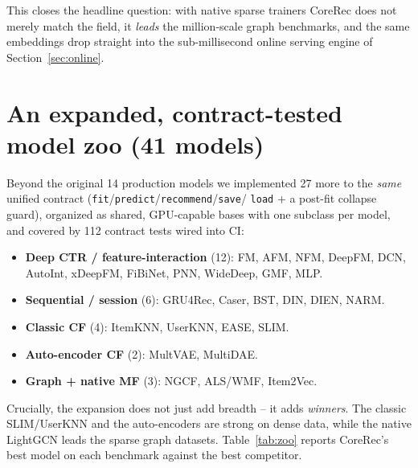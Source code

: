 \documentclass[10pt]{article}
\begin{document}
This closes the headline question: with native sparse trainers CoreRec does not
merely match the field, it \emph{leads} the million-scale graph benchmarks, and the
same embeddings drop straight into the sub-millisecond online serving engine of
Section~\ref{sec:online}.

\section{An expanded, contract-tested model zoo (41 models)}
\label{sec:zoo}
Beyond the original 14 production models we implemented 27 more to the \emph{same}
unified contract (\texttt{fit}/\texttt{predict}/\texttt{recommend}/\texttt{save}/
\texttt{load} + a post-fit collapse guard), organized as shared, GPU-capable bases
with one subclass per model, and covered by 112 contract tests wired into CI:

\begin{itemize}
\item \textbf{Deep CTR / feature-interaction} (12): FM, AFM, NFM, DeepFM, DCN,
AutoInt, xDeepFM, FiBiNet, PNN, WideDeep, GMF, MLP.
\item \textbf{Sequential / session} (6): GRU4Rec, Caser, BST, DIN, DIEN, NARM.
\item \textbf{Classic CF} (4): ItemKNN, UserKNN, EASE, SLIM.
\item \textbf{Auto-encoder CF} (2): MultVAE, MultiDAE.
\item \textbf{Graph + native MF} (3): NGCF, ALS/WMF, Item2Vec.
\end{itemize}

Crucially, the expansion does not just add breadth -- it adds \emph{winners}. The
classic SLIM/UserKNN and the auto-encoders are strong on dense data, while the
native LightGCN leads the sparse graph datasets. Table~\ref{tab:zoo} reports
CoreRec's best model on each benchmark against the best competitor.
\end{document}
